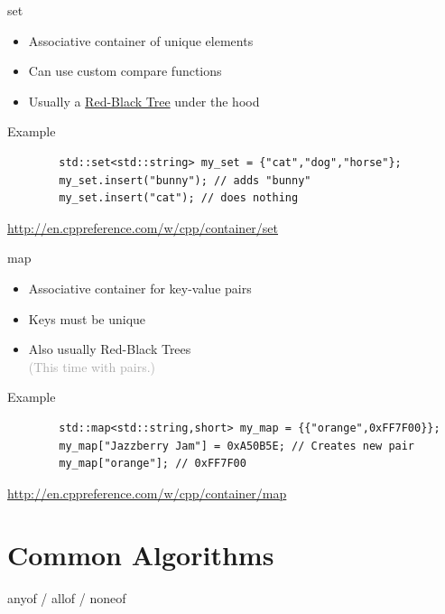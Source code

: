 \documentclass{beamer}
\begin{document}
\begin{frame}[fragile]{set}
	\begin{itemize}
		\item Associative container of unique elements
		\item Can use custom compare functions
		\item Usually a \href{https://en.wikipedia.org/wiki/Red-black_tree}{Red-Black Tree} under the hood
	\end{itemize}
	\bigskip
	\begin{exampleblock}{Example}
		\begin{verbatim}
		std::set<std::string> my_set = {"cat","dog","horse"};
		my_set.insert("bunny"); // adds "bunny"
		my_set.insert("cat"); // does nothing
		\end{verbatim}
	\end{exampleblock}
	\bigskip
	\begin{center}
		\tiny \url{http://en.cppreference.com/w/cpp/container/set}
	\end{center}
\end{frame}

\begin{frame}[fragile]{map}
	\begin{itemize}
		\item Associative container for key-value pairs
		\item Keys must be unique
		\item Also usually Red-Black Trees \\
		\textcolor{darkgray}{(This time with pairs.)}
	\end{itemize}
	\bigskip
	\begin{exampleblock}{Example}
		\begin{verbatim}
		std::map<std::string,short> my_map = {{"orange",0xFF7F00}};
		my_map["Jazzberry Jam"] = 0xA50B5E; // Creates new pair
		my_map["orange"]; // 0xFF7F00
		\end{verbatim}
	\end{exampleblock}
	\bigskip
	\begin{center}
		\tiny \url{http://en.cppreference.com/w/cpp/container/map}
	\end{center}
\end{frame}

\section{Common Algorithms}

\begin{frame}{any\textunderscore of / all\textunderscore of / none\textunderscore of}

\end{frame}
\end{document}
